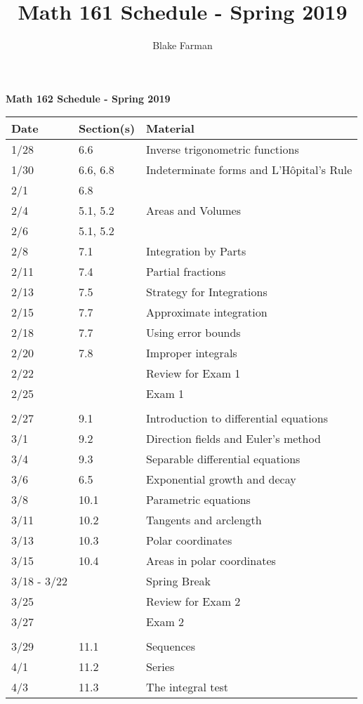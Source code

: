 \documentclass[10pt]{amsart}
\author{Blake Farman}
\title[Schedule]{Math 161 Schedule - Spring 2019}
\begin{document}

\begin{center}
  \textbf{Math 162 Schedule - Spring 2019}
  \begin{tabular}{lll}
  Date & Section(s) & Material\\
  \hline
  1/28 & 6.6 & Inverse trigonometric functions\\
  1/30 & 6.6, 6.8 & Indeterminate forms and L'H\^opital's Rule\\
  2/1 & 6.8\\
  2/4 & 5.1, 5.2 & Areas and Volumes\\
  2/6 & 5.1, 5.2\\
  2/8 & 7.1 & Integration by Parts\\
  2/11 & 7.4 & Partial fractions\\
  2/13 & 7.5 & Strategy for Integrations\\
  2/15 & 7.7 & Approximate integration\\
  2/18 & 7.7 & Using error bounds\\
  2/20 & 7.8 & Improper integrals\\
  2/22 & & Review for Exam 1\\
  2/25 & & Exam 1\\
  \hline\\
  2/27 & 9.1 & Introduction to differential equations\\ 
  3/1 & 9.2 & Direction fields and Euler's method\\
  3/4 & 9.3 & Separable differential equations\\
  3/6 & 6.5 & Exponential growth and decay\\
  3/8 & 10.1 & Parametric equations\\
  3/11 & 10.2 & Tangents and arclength\\
  3/13 & 10.3 & Polar coordinates\\
  3/15 & 10.4 & Areas in polar coordinates\\
  3/18 - 3/22 & & Spring Break\\
  3/25 & & Review for Exam 2\\
  3/27 & & Exam 2\\
  \hline\\
  3/29 & 11.1 & Sequences\\
  4/1 & 11.2 & Series\\ 
  4/3 & 11.3 & The integral test\\

\end{tabular}
\end{center}
\end{document}
